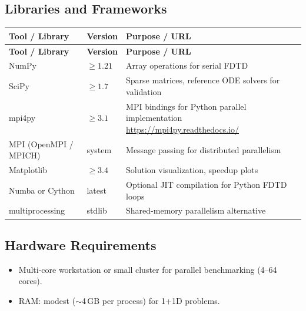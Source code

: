 \documentclass[11pt,a4paper]{article}
\begin{document}
\subsection{Libraries and Frameworks}
\begin{longtable}{p{4.5cm} p{2.5cm} p{6.5cm}}
\toprule
\textbf{Tool / Library} & \textbf{Version} & \textbf{Purpose / URL} \\
\midrule
\endfirsthead
\toprule
\textbf{Tool / Library} & \textbf{Version} & \textbf{Purpose / URL} \\
\midrule
\endhead
NumPy & $\geq 1.21$ & Array operations for serial FDTD \\
\midrule
SciPy & $\geq 1.7$ & Sparse matrices, reference ODE solvers for validation \\
\midrule
mpi4py & $\geq 3.1$ & MPI bindings for Python parallel implementation \newline \url{https://mpi4py.readthedocs.io/} \\
\midrule
MPI (OpenMPI / MPICH) & system & Message passing for distributed parallelism \\
\midrule
Matplotlib & $\geq 3.4$ & Solution visualization, speedup plots \\
\midrule
Numba or Cython & latest & Optional JIT compilation for Python FDTD loops \\
\midrule
multiprocessing & stdlib & Shared-memory parallelism alternative \\
\bottomrule
\end{longtable}

\subsection{Hardware Requirements}
\begin{itemize}
  \item Multi-core workstation or small cluster for parallel benchmarking (4--64 cores).
  \item RAM: modest ($\sim$4\,GB per process) for 1+1D problems.
\end{itemize}
\end{document}
